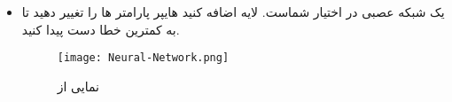 \documentclass{report}
\begin{document}
\begin{itemize}
		\item {}
		
		یک شبکه عصبی در اختیار شماست. لایه اضافه کنید هایپر پارامتر ها را تغییر دهید تا به کمترین خطا دست پیدا کنید. 
		
		\begin{figure}
			\centering
			\texttt{[image: Neural-Network.png]}
			\caption{نمایی از
			}
			\label{fig:Neural-Network}
		\end{figure}
	\end{itemize}
	

	
	
\end{document}

